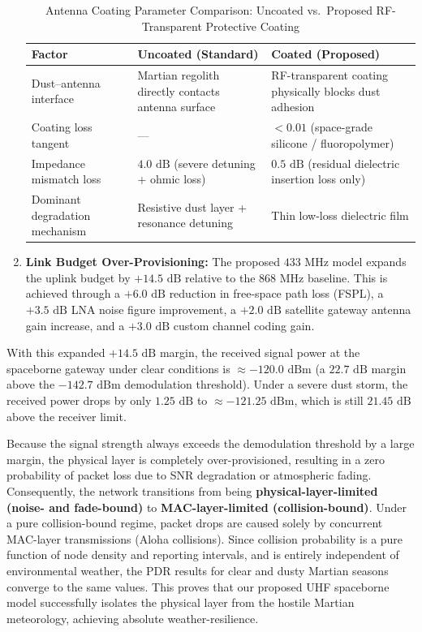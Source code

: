 \documentclass[journal,10pt,doublecolumn]{IEEEtran}
\begin{document}
\begin{enumerate}
\begin{table}[h]
\renewcommand{\arraystretch}{1.3}
\caption{Antenna Coating Parameter Comparison: Uncoated vs.\ Proposed RF-Transparent Protective Coating}
\label{tab:coating}
\centering
\begin{tabular}{p{2.1cm}|p{2.6cm}|p{2.6cm}}
\hline
\textbf{Factor} & \textbf{Uncoated (Standard)} & \textbf{Coated (Proposed)} \\
\hline
Dust--antenna interface & Martian regolith directly contacts antenna surface & RF-transparent coating physically blocks dust adhesion \\
\hline
Coating loss tangent & --- & $< 0.01$ (space-grade silicone / fluoropolymer) \\
\hline
Impedance mismatch loss & $4.0\text{ dB}$ (severe detuning + ohmic loss) & $0.5\text{ dB}$ (residual dielectric insertion loss only) \\
\hline
Dominant degradation mechanism & Resistive dust layer + resonance detuning & Thin low-loss dielectric film \\
\hline
\end{tabular}
\end{table}
    \item \textbf{Link Budget Over-Provisioning:} The proposed $433\text{ MHz}$ model expands the uplink budget by $+14.5\text{ dB}$ relative to the $868\text{ MHz}$ baseline. This is achieved through a $+6.0\text{ dB}$ reduction in free-space path loss (FSPL), a $+3.5\text{ dB}$ LNA noise figure improvement, a $+2.0\text{ dB}$ satellite gateway antenna gain increase, and a $+3.0\text{ dB}$ custom channel coding gain.
\end{enumerate}

With this expanded $+14.5\text{ dB}$ margin, the received signal power at the spaceborne gateway under clear conditions is $\approx -120.0\text{ dBm}$ (a $22.7\text{ dB}$ margin above the $-142.7\text{ dBm}$ demodulation threshold). Under a severe dust storm, the received power drops by only $1.25\text{ dB}$ to $\approx -121.25\text{ dBm}$, which is still $21.45\text{ dB}$ above the receiver limit. 

Because the signal strength always exceeds the demodulation threshold by a large margin, the physical layer is completely over-provisioned, resulting in a zero probability of packet loss due to SNR degradation or atmospheric fading. Consequently, the network transitions from being \textbf{physical-layer-limited (noise- and fade-bound)} to \textbf{MAC-layer-limited (collision-bound)}. Under a pure collision-bound regime, packet drops are caused solely by concurrent MAC-layer transmissions (Aloha collisions). Since collision probability is a pure function of node density and reporting intervals, and is entirely independent of environmental weather, the PDR results for clear and dusty Martian seasons converge to the same values. This proves that our proposed UHF spaceborne model successfully isolates the physical layer from the hostile Martian meteorology, achieving absolute weather-resilience.
\end{document}
